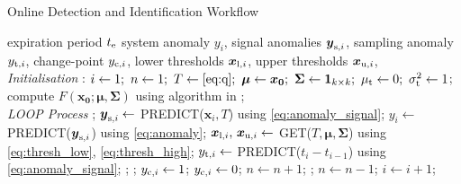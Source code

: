 \begin{algorithm}[H]
  \caption{{Online Detection and Identification Workflow}} \label{alg:detector}
  \begin{algorithmic}[1]
    \renewcommand{\algorithmicrequire}{\textbf{Input:}}
    \renewcommand{\algorithmicensure}{\textbf{Output:}}
    \REQUIRE expiration period $t _{\text{e}}$
    \ENSURE system anomaly $y_i$, signal anomalies $\boldsymbol{y} _{\text{s}, i}$, sampling anomaly $y _{\text{t}, i}$, change-point $y _{\text{c}, i}$, lower thresholds $\boldsymbol{x} _{\text{l}, i}$, upper thresholds $\boldsymbol{x} _{\text{u}, i}$,
    \\ \textit{Initialisation} :
    \STATE $i \leftarrow 1;~ n \leftarrow 1;~ T \leftarrow \eqref{eq:q};~ \boldsymbol{\mu} \leftarrow \boldsymbol{x_0};~ \boldsymbol{\Sigma} \leftarrow \mathbf{1}_{k \times k};~ \mu _{\text{t}} \leftarrow 0;~ \sigma _{\text{t}}^2 \leftarrow 1$;
    \STATE compute $F(\boldsymbol{x_0}; \boldsymbol{\mu}, \boldsymbol{\Sigma})$ using algorithm in \citet{Genz2000};
    \\ \textit{LOOP Process}
    \LOOP
    ;
    \STATE $\boldsymbol{y} _{\text{s}, i} \leftarrow$ PREDICT($\boldsymbol{x}_i, T$) using \eqref{eq:anomaly_signal};
    \STATE $y_i \leftarrow$ PREDICT($\boldsymbol{y} _{\text{s}, i}$) using \eqref{eq:anomaly};
    \STATE $\boldsymbol{x} _{\text{l}, i}\text{, }\boldsymbol{x} _{\text{u}, i} \leftarrow$ GET($T, \boldsymbol{\mu}, \boldsymbol{\Sigma}$) using \eqref{eq:thresh_low}, \eqref{eq:thresh_high};
    \STATE $y _{\text{t}, i} \leftarrow$ PREDICT($t_i - t_{i-1}$) using \eqref{eq:anomaly_signal};
    ;
    \IF {\eqref{eq:anomaly} = 0 \OR \eqref{eq:changepoint}}
    ;
    \IF {\eqref{eq:changepoint}}
    \STATE $y _{\text{c}, i} \leftarrow 1$;
    \ELSE
    \STATE $y _{\text{c}, i} \leftarrow 0$;
    \ENDIF
    \STATE $n \leftarrow n + 1$;
    ;
    \STATE $n \leftarrow n - 1$;
    \ENDFOR
    \ENDIF
    \STATE $i \leftarrow i + 1$;
    \ENDLOOP
  \end{algorithmic}
\end{algorithm}
